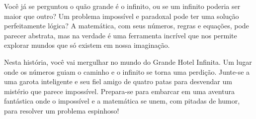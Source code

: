Você já se perguntou o quão grande é o infinito, ou se um infinito poderia ser maior que outro? Um problema impossível e paradoxal pode ter uma solução perfeitamente lógica? A matemática, com seus números, regras e equações, pode parecer abstrata, mas na verdade é uma ferramenta incrível que nos permite explorar mundos que só existem em nossa imaginação.

Nesta história, você vai mergulhar no mundo do Grande Hotel Infinita. Um lugar onde os números guiam o caminho e o infinito se torna uma perdição. Junte-se a uma garota inteligente e seu fiel amigo de quatro patas para desvendar um mistério que parece impossível. Prepara-se para embarcar em uma aventura fantástica onde o impossível e a matemática se unem, com pitadas de humor, para resolver um problema espinhoso!
